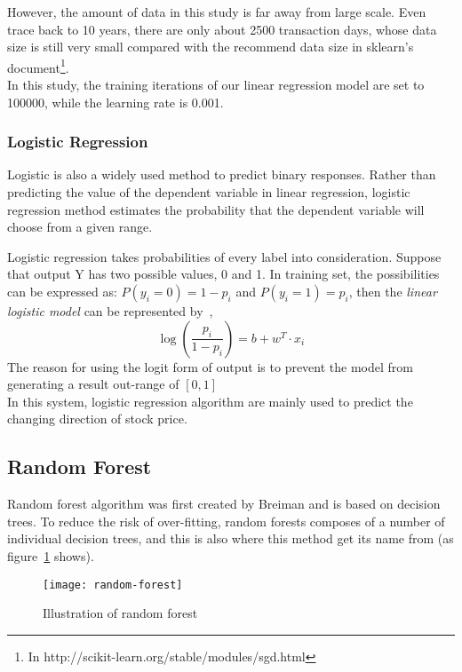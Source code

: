 However, the amount of data in this study is far away from large scale. Even trace back to 10 years, there are only about 2500 transaction days, whose data size is still very small compared with the recommend data size in sklearn's document\footnote{In http://scikit-learn.org/stable/modules/sgd.html}.\\

In this study, the training iterations of our linear regression model are set to 100000, while the learning rate is 0.001.

\subsubsection{Logistic Regression}
Logistic is also a widely used method to predict binary responses. Rather than predicting the value of the dependent variable in linear regression, logistic regression method estimates the probability that the dependent variable will choose from a given range\cite[Section~5.6, p.~157--158]{4_kantardzic}.

 
Logistic regression takes probabilities of every label into consideration. Suppose that output Y has two possible values, 0 and 1. In training set, the possibilities can be expressed as: $ P(y_i=0)=1-p_i $ and $ P(y_i=1)=p_i $, then the \textit{linear logistic model} can be represented by~\cite[Section~5.6, p.~157--158]{4_kantardzic},
\begin{equation}
	\log (\frac{p_i}{1-p_i}) = b + w^T \cdot x_i
\end{equation}
The reason for using the logit form of output is to prevent the model from generating a result out-range of $ [0, 1] $\\


In this system, logistic regression algorithm are mainly used to predict the changing direction of stock price.

\subsection{Random Forest}
Random forest algorithm was first created by Breiman and is based on decision trees\cite{lauretto2013evaluation}. To reduce the risk of over-fitting, random forests composes of a number of individual decision trees, and this is also where this method get its name from (as figure~\ref{fg:decision-tree} shows).
\begin{figure}[h]
	\centering
	\texttt{[image: random-forest]}
	\caption{Illustration of random forest}
	\label{fg:decision-tree}
\end{figure}


